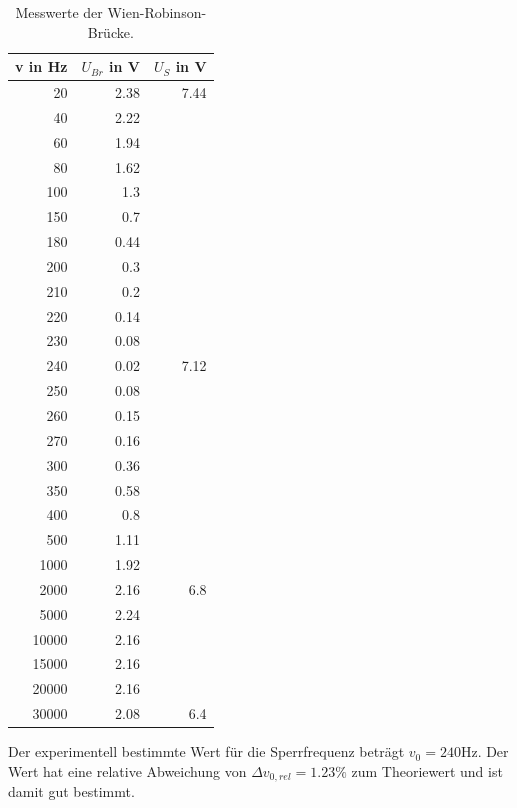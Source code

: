 \begin{table}
  \centering
  \begin{tabular}{r r r}
  \toprule
  v in \si{\hertz} & $U_{Br}$ in \si{\volt} & $U_S$ in \si{\volt} \\
  \midrule
  20    &  2.38  &  7.44\\
  40    &  2.22  &      \\
  60    &  1.94  &      \\
  80    &  1.62  &      \\
  100   &  1.3   &      \\
  150   &  0.7   &      \\
  180   &  0.44  &      \\
  200   &  0.3   &      \\
  210   &  0.2   &      \\
  220   &  0.14  &      \\
  230   &  0.08  &      \\
  240   &  0.02  &  7.12\\
  250   &  0.08  &      \\
  260   &  0.15  &      \\
  270   &  0.16  &      \\
  300   &  0.36  &      \\
  350   &  0.58  &      \\
  400   &  0.8   &      \\
  500   &  1.11  &      \\
  1000  &  1.92  &      \\
  2000  &  2.16  &  6.8 \\
  5000  &  2.24  &      \\
  10000 &  2.16  &      \\
  15000 &  2.16  &      \\
  20000 &  2.16  &      \\
  30000 &  2.08  &  6.4 \\
\end{tabular}
\caption{Messwerte der Wien-Robinson-Brücke.}
\label{tab:messwerte6}
\end{table}
Der experimentell bestimmte Wert für die Sperrfrequenz beträgt $v_0 = 240 \si{\hertz}$.
Der Wert hat eine relative Abweichung von $\Delta v_{0,rel} = 1.23 \%$ zum
Theoriewert und ist damit gut bestimmt.
